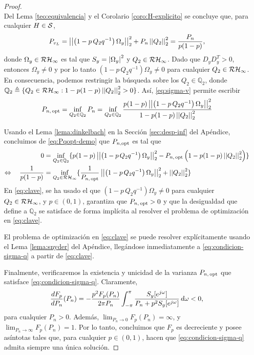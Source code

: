 \begin{proof}{\ \\}
Del Lema \ref{teo:equivalencia} y el Corolario \ref{coro:H-explicito} se concluye que, para cualquier $H \in \cal{S}$,
\begin{align}\label{eq:sigma-v}
P_{v_L} = \norma{ \left( 1 -  p\, Q_2 q^{-1} \right) \Omega_y }_2^2 + P_{n} \norma{Q_2}_2^2 = \frac{P_n}{p(1-p)},
\end{align}
donde $\Omega_y\in\cal{RH}_{\infty}$ es tal que $S_y=\abs{\Omega_y}^2$ y $Q_2\in\cal{RH}_{\infty}$. Dado que $D_yD_y^T>0$, entonces $\Omega_y\neq 0$ y por lo tanto $\left( 1 - p\, Q_2 q^{-1} \right)\Omega_y \neq 0$ para cualquier $Q_2\in\cal{RH}_{\infty}$. En consecuencia, podemos restringir la b\'usqueda sobre los $Q_2 \in \mathbb{Q}_2$,
donde $\mathbb{Q}_2 \treq \{ Q_2\in \cal{RH}_{\infty}: 1 - p(1-p)\norma{Q_2}_2^2 > 0 \}$. As\'i, \eqref{eq:sigma-v} permite escribir
\begin{align}\label{eq:Pqopt-demo}
P_{n, \, \opt} = \inf_{Q_2\in \mathbb{Q}_2 } P_n = \inf_{Q_2\in \mathbb{Q}_2 } \frac{ p(1-p) \norma{ \left( 1 - p\, Q_2 q^{-1} \right) \Omega_y }_2^2 }{ 1 - p(1-p) \norma{Q_2}_2^2 }
\end{align}

Usando el Lema \ref{lema:dinkelbach} en la Secci\'on \ref{sec:desp-inf} del Ap\'endice, concluimos de \eqref{eq:Pqopt-demo} que $P_{n,\opt}$ es tal que
\begin{align}\label{eq:clave}
0 & = \inf_{Q_2\in \mathbb{Q}_2} \lbrace p(1-p) \norma{ \left( 1 - p\, Q_2 q^{-1} \right) \Omega_y }_2^2 - P_{n, \, \opt} \left( 1 - p(1-p) \norma{Q_2}_2^2 \right) \rbrace \non \\
\equivale  \quad \frac{1}{p(1-p)} & = \inf_{Q_2\in \cal{RH}_{\infty} } \lbrace \frac{1}{ P_{n, \, \opt} } \norma{ \left( 1 - p\, Q_2 q^{-1} \right) \Omega_y }_2^2 + \norma{Q_2}_2^2 \rbrace
\end{align}
En \eqref{eq:clave}, se ha usado el que $\left( 1 - p\, Q_2 q^{-1} \right) \Omega_y \neq 0$ para cualquier $Q_2\in\cal{RH}_{\infty}$, y $p\in(0,1)$, garantiza que $P_{n, \, \opt} > 0$ y que la desigualdad que define a $\mathbb{Q}_2$ se satisface de forma impl\'icita al resolver el problema de optimizaci\'on en \eqref{eq:clave}.

El problema de optimizaci\'on en \eqref{eq:clave} se puede resolver expl\'icitamente usando el Lema \ref{lema:snyder} del Ap\'endice, lleg\'andose inmediatamente a \eqref{eq:condicion-sigma-q} a partir de \eqref{eq:clave}.

Finalmente, verificaremos la existencia y unicidad de la varianza $P_{n,\,\opt}$ que satisface \eqref{eq:condicion-sigma-q}. Claramente,
\begin{align}
\frac{ dF_p }{d P_n} (P_n) = -\frac{p^2 F_p(P_n)}{ 2\pi P_n} \intpi{ \frac{S_y\ejw }{P_n + p^2 S_y\ejw} \, } < 0,
\end{align}
para cualquier $P_n>0$. Adem\'as, $\lim_{P_n \to 0} F_p(P_n)=\infty$, y $\lim_{P_n\to \infty}F_p(P_n) = 1$. Por lo tanto, concluimos que $F_p$ es decreciente y posee as\'intotas tales que, para cualquier $p\in (0,1)$, hacen que \eqref{eq:condicion-sigma-q} admita siempre una \'unica soluci\'on.
\QED
\end{proof}

